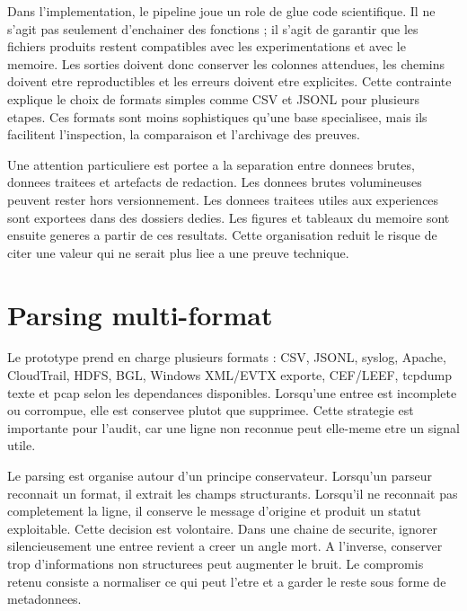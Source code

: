 Dans l'implementation, le pipeline joue un role de glue code scientifique. Il ne s'agit pas seulement d'enchainer des fonctions ; il s'agit de garantir que les fichiers produits restent compatibles avec les experimentations et avec le memoire. Les sorties doivent donc conserver les colonnes attendues, les chemins doivent etre reproductibles et les erreurs doivent etre explicites. Cette contrainte explique le choix de formats simples comme CSV et JSONL pour plusieurs etapes. Ces formats sont moins sophistiques qu'une base specialisee, mais ils facilitent l'inspection, la comparaison et l'archivage des preuves.

Une attention particuliere est portee a la separation entre donnees brutes, donnees traitees et artefacts de redaction. Les donnees brutes volumineuses peuvent rester hors versionnement. Les donnees traitees utiles aux experiences sont exportees dans des dossiers dedies. Les figures et tableaux du memoire sont ensuite generes a partir de ces resultats. Cette organisation reduit le risque de citer une valeur qui ne serait plus liee a une preuve technique.

\section{Parsing multi-format}
Le prototype prend en charge plusieurs formats : CSV, JSONL, syslog, Apache, CloudTrail, HDFS, BGL, Windows XML/EVTX exporte, CEF/LEEF, tcpdump texte et pcap selon les dependances disponibles. Lorsqu'une entree est incomplete ou corrompue, elle est conservee plutot que supprimee. Cette strategie est importante pour l'audit, car une ligne non reconnue peut elle-meme etre un signal utile.

Le parsing est organise autour d'un principe conservateur. Lorsqu'un parseur reconnait un format, il extrait les champs structurants. Lorsqu'il ne reconnait pas completement la ligne, il conserve le message d'origine et produit un statut exploitable. Cette decision est volontaire. Dans une chaine de securite, ignorer silencieusement une entree revient a creer un angle mort. A l'inverse, conserver trop d'informations non structurees peut augmenter le bruit. Le compromis retenu consiste a normaliser ce qui peut l'etre et a garder le reste sous forme de metadonnees.

